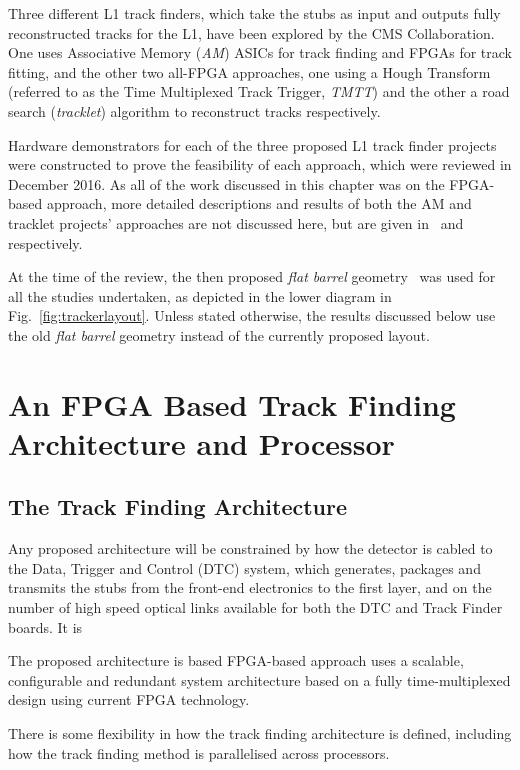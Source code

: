 Three different L1 track finders, which take the stubs as input and outputs fully reconstructed tracks for the L1, have been explored by the CMS Collaboration.
One uses Associative Memory (\emph{AM}) ASICs for track finding and FPGAs for track fitting, and the other two all-FPGA approaches, one using a Hough Transform (referred to as the Time Multiplexed Track Trigger, \emph{TMTT}) and the other a road search (\emph{tracklet}) algorithm to reconstruct tracks respectively.

Hardware demonstrators for each of the three proposed L1 track finder projects were constructed to prove the feasibility of each approach, which were reviewed in December 2016.
As all of the work discussed in this chapter was on the FPGA-based \HT approach, more detailed descriptions and results of both the AM and tracklet projects' approaches are not discussed here, but are given in~\cite{AM,P2TrackerTDR} and~\cite{tracklet,P2TrackerTDR} respectively.

At the time of the review, the then proposed \emph{flat barrel} geometry~\cite{CMS_Upgrade_TP} was used for all the studies undertaken, as depicted in the lower diagram in Fig.~\ref{fig:trackerlayout}.
Unless stated otherwise, the results discussed below use the old \emph{flat barrel} geometry instead of the currently proposed layout.

\section{An FPGA Based Track Finding Architecture and Processor}
\subsection{The Track Finding Architecture}
Any proposed architecture will be constrained by how the detector is cabled to the Data, Trigger and Control (DTC) system, which generates, packages and transmits the stubs from the front-end electronics to the first layer, and on the number of high speed optical links available for both the DTC and Track Finder boards.
It is 

The proposed architecture is based
FPGA-based \HT approach uses a scalable, configurable and redundant system architecture based on a fully time-multiplexed design using current FPGA technology.

There is some flexibility in how the track finding architecture is defined, including how the track finding method is parallelised across processors.

